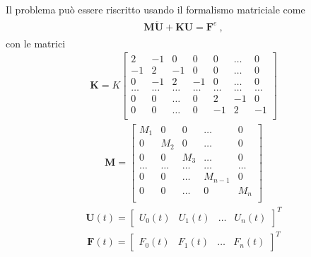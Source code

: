 \documentclass[letterpaper,10pt,italian]{jupyterBook}
\begin{document}
\sphinxAtStartPar
{} Il problema può essere riscritto usando il formalismo matriciale come
\begin{equation*}
\begin{split}\begin{aligned}
  \mathbf{M} \ddot{\mathbf{U}} + \mathbf{K} \mathbf{U} = \mathbf{F}^e \ ,
\end{aligned}\end{split}
\end{equation*}
\sphinxAtStartPar
con le matrici
\begin{equation*}
\begin{split}\mathbf{K} = K \begin{bmatrix}
   2    & -1    &  0    &  0    & 0     & \dots & 0     \\
  -1    &  2    & -1    &  0    & 0     & \dots & 0     \\ 
   0    & -1    &  2    & -1    & 0     & \dots & 0     \\
  \dots & \dots & \dots & \dots & \dots & \dots & \dots \\
   0    & 0     & \dots & 0     &    2  & -1    &  0    \\  
   0    & 0     & \dots & 0     &   -1  &  2    & -1    \\  
\end{bmatrix}\end{split}
\end{equation*}\begin{equation*}
\begin{split}\mathbf{M} = \begin{bmatrix}
   M_1  &  0    &  0    &  \dots   & 0     \\
   0    &  M_2  &  0    &  \dots   & 0     \\ 
   0    &  0    &  M_3  &  \dots   & 0     \\
  \dots & \dots & \dots &  \dots   & \dots \\
   0    & 0     & \dots &  M_{n-1} & 0     \\  
   0    & 0     & \dots &  0       & M_n   \\  
\end{bmatrix}\end{split}
\end{equation*}\begin{equation*}
\begin{split}\mathbf{U}(t) = \begin{bmatrix} U_0(t) & U_1(t) & \dots & U_n(t) \end{bmatrix}^T\end{split}
\end{equation*}\begin{equation*}
\begin{split}\mathbf{F}(t) = \begin{bmatrix} F_0(t) & F_1(t) & \dots & F_n(t) \end{bmatrix}^T\end{split}
\end{equation*}
\end{document}
